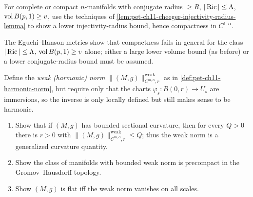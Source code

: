 \begin{remark}
  \label{rem:pet-ch11-exercise-11-6-13}

  For complete or compact $n$-manifolds with
  conjugate radius $\ge R$, $|\operatorname{Ric}|\le\Lambda$, $\operatorname{vol} B(p,1)\ge v$, use the
  techniques of \cref{lem:pet-ch11-cheeger-injectivity-radius-lemma} to show
  a lower injectivity-radius bound, hence compactness in $C^{1,\alpha}$.
\end{remark}

\begin{remark}
  \label{rem:pet-ch11-exercise-11-6-14}

  The Eguchi--Hanson metrics show that compactness fails in general for the
  class $|\operatorname{Ric}|\le\Lambda$, $\operatorname{vol} B(p,1)\ge v$ alone; either a
  large lower volume bound (as before) or a lower conjugate-radius bound must
  be assumed.
\end{remark}

\begin{remark}
  \label{rem:pet-ch11-exercise-11-6-15}

  Define the \emph{weak (harmonic) norm} $\|(M,g)\|^{\mathrm{weak}}_{C^{m,\alpha},r}$
  as in \cref{def:pet-ch11-harmonic-norm}, but require only that the charts
  $\varphi_s:B(0,r)\to U_s$ are immersions, so the
  inverse is only locally defined but still makes sense to be harmonic.
  \begin{enumerate}
  \item Show that if $(M,g)$ has bounded sectional curvature, then for every
    $Q>0$ there is $r>0$ with $\|(M,g)\|^{\mathrm{weak}}_{C^{m,\alpha},r}\le Q$;
    thus the weak norm is a generalized curvature quantity.
  \item Show the class of manifolds with bounded weak norm is precompact in
    the Gromov--Hausdorff topology.
  \item Show $(M,g)$ is flat iff the weak norm vanishes on all scales.
  \end{enumerate}
\end{remark}
